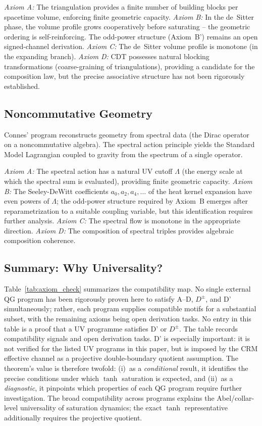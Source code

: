 \documentclass[aps,prd,twocolumn,superscriptaddress,nofootinbib]{revtex4-2}
\begin{document}
\textit{Axiom A:} The triangulation provides a finite number of building blocks per spacetime volume, enforcing finite geometric capacity. \textit{Axiom B:} In the de~Sitter phase, the volume profile grows cooperatively before saturating -- the geometric ordering is self-reinforcing. The odd-power structure (Axiom~B') remains an open signed-channel derivation. \textit{Axiom C:} The de~Sitter volume profile is monotone (in the expanding branch). \textit{Axiom D:} CDT possesses natural blocking transformations (coarse-graining of triangulations), providing a candidate for the composition law, but the precise associative structure has not been rigorously established.

\subsection{Noncommutative Geometry}

Connes' program \cite{Connes1994} reconstructs geometry from spectral data (the Dirac operator on a noncommutative algebra). The spectral action principle yields the Standard Model Lagrangian coupled to gravity from the spectrum of a single operator.

\textit{Axiom A:} The spectral action has a natural UV cutoff $\Lambda$ (the energy scale at which the spectral sum is evaluated), providing finite geometric capacity. \textit{Axiom B:} The Seeley-DeWitt coefficients $a_0, a_2, a_4, \ldots$ of the heat kernel expansion have even powers of $\Lambda$; the odd-power structure required by Axiom~B emerges after reparametrization to a suitable coupling variable, but this identification requires further analysis. \textit{Axiom C:} The spectral flow is monotone in the appropriate direction. \textit{Axiom D:} The composition of spectral triples provides algebraic composition coherence.

\subsection{Summary: Why Universality?}

Table~\ref{tab:axiom_check} summarizes the compatibility map. No single external QG program has been rigorously proven here to satisfy A--D, $D^\pm$, and D' simultaneously; rather, each program supplies compatible motifs for a substantial subset, with the remaining axioms being open derivation tasks. No entry in this table is a proof that a UV programme satisfies D' or $D^\pm$. The table records compatibility signals and open derivation tasks. D' is especially important: it is not verified for the listed UV programs in this paper, but is imposed by the CRM effective channel as a projective double-boundary quotient assumption. The theorem's value is therefore twofold: (i)~as a \textit{conditional} result, it identifies the precise conditions under which $\tanh$ saturation is expected, and (ii)~as a \textit{diagnostic}, it pinpoints which properties of each QG program require further investigation. The broad compatibility across programs explains the Abel/collar-level universality of saturation dynamics; the exact $\tanh$ representative additionally requires the projective quotient.
\end{document}
